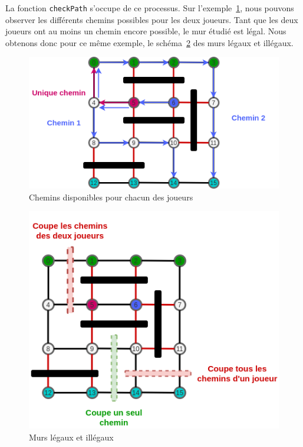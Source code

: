 \documentclass[a4paper]{article}
\begin{document}
La fonction \texttt{checkPath} s'occupe de ce processus. Sur l'exemple~\ref{fig:check_path1}, nous pouvons observer les différents chemins possibles pour les deux joueurs. Tant que les deux joueurs ont au moins un chemin encore possible, le mur étudié est légal. Nous obtenons donc pour ce même exemple, le schéma~\ref{fig:check_path2} des murs légaux et illégaux.

\begin{figure}[ht!]
    \centering
    \includegraphics[scale=0.7]{check_path1.png}
    \caption{Chemins disponibles pour chacun des joueurs}
    \label{fig:check_path1}
\end{figure}

\begin{figure}[ht!]
    \centering
    \includegraphics[scale=0.7]{check_path2.png}
    \caption{Murs légaux et illégaux}
    \label{fig:check_path2}
\end{figure}
\end{document}

